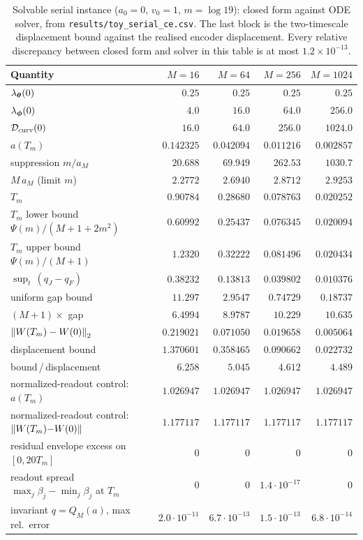 \begin{table}[htbp]
\centering
\small
\caption{Solvable serial instance ($a_0 = 0$, $v_0 = 1$, $m = \log 19$):
closed form against ODE solver, from \texttt{results/toy\_serial\_ce.csv}. The
last block is the two-timescale displacement bound against the realised
encoder displacement. Every relative discrepancy between closed form and
solver in this table is at most $1.2\times10^{-13}$.}
\label{tab:app_toy}
\begin{tabular}{lrrrr}
\toprule
Quantity & $M = 16$ & $M = 64$ & $M = 256$ & $M = 1024$ \\
\midrule
$\lambda_{\boldsymbol{\theta}}(0)$ & $0.25$ & $0.25$ & $0.25$ & $0.25$ \\
$\lambda_{\boldsymbol{\phi}}(0)$ & $4.0$ & $16.0$ & $64.0$ & $256.0$ \\
$\mathcal{D}_{\mathrm{curv}}(0)$ & $16.0$ & $64.0$ & $256.0$ & $1024.0$ \\
\midrule
$a(T_m)$ & $0.142325$ & $0.042094$ & $0.011216$ & $0.002857$ \\
suppression $m/a_M$ & $20.688$ & $69.949$ & $262.53$ & $1030.7$ \\
$M\,a_M$ (limit $m$) & $2.2772$ & $2.6940$ & $2.8712$ & $2.9253$ \\
$T_m$ & $0.90784$ & $0.28680$ & $0.078763$ & $0.020252$ \\
$T_m$ lower bound $\Psi(m)/(M{+}1{+}2m^2)$ & $0.60992$ & $0.25437$ & $0.076345$ & $0.020094$ \\
$T_m$ upper bound $\Psi(m)/(M{+}1)$ & $1.2320$ & $0.32222$ & $0.081496$ & $0.020434$ \\
\midrule
$\sup_t\,(q_J - q_F)$ & $0.38232$ & $0.13813$ & $0.039802$ & $0.010376$ \\
uniform gap bound & $11.297$ & $2.9547$ & $0.74729$ & $0.18737$ \\
$(M{+}1)\times$ gap & $6.4994$ & $8.9787$ & $10.229$ & $10.635$ \\
\midrule
$\left\lVert W(T_m) - W(0)\right\rVert_2$ & $0.219021$ & $0.071050$ & $0.019658$ & $0.005064$ \\
displacement bound & $1.370601$ & $0.358465$ & $0.090662$ & $0.022732$ \\
bound\,/\,displacement & $6.258$ & $5.045$ & $4.612$ & $4.489$ \\
\midrule
normalized-readout control: $a(T_m)$ & $1.026947$ & $1.026947$ & $1.026947$ & $1.026947$ \\
normalized-readout control: $\left\lVert W(T_m){-}W(0)\right\rVert$ & $1.177117$ & $1.177117$ & $1.177117$ & $1.177117$ \\
\midrule
residual envelope excess on $[0, 20T_m]$ & $0$ & $0$ & $0$ & $0$ \\
readout spread $\max_j\beta_j - \min_j\beta_j$ at $T_m$ & $0$ & $0$ & $1.4\cdot10^{-17}$ & $0$ \\
invariant $q = Q_M(a)$, max rel.\ error & $2.0\cdot10^{-11}$ & $6.7\cdot10^{-13}$ & $1.5\cdot10^{-13}$ & $6.8\cdot10^{-14}$ \\
\bottomrule
\end{tabular}
\end{table}

